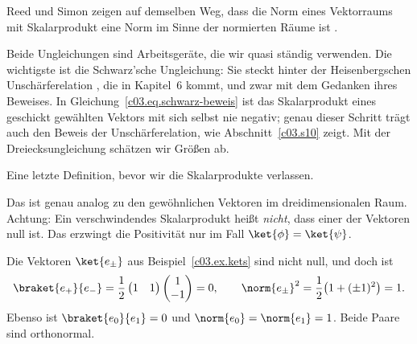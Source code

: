 Reed und Simon zeigen auf demselben Weg, dass die Norm eines Vektorraums mit Skalarprodukt
eine Norm im Sinne der normierten Räume ist .

Beide Ungleichungen sind Arbeitsgeräte, die wir quasi ständig verwenden. Die wichtigste ist
die Schwarz'sche Ungleichung: Sie steckt hinter der Heisenbergschen Unschärferelation
, die in Kapitel~6 kommt, und zwar
mit dem Gedanken ihres Beweises. In Gleichung~\eqref{c03.eq.schwarz-beweis} ist das
Skalarprodukt eines geschickt gewählten Vektors mit sich selbst nie negativ; genau dieser
Schritt trägt auch den Beweis der Unschärferelation, wie Abschnitt~\ref{c03.s10} zeigt. Mit der
Dreiecksungleichung schätzen wir Größen ab.

Eine letzte Definition, bevor wir die Skalarprodukte verlassen.


Das ist genau analog zu den gewöhnlichen Vektoren im dreidimensionalen Raum. Achtung: Ein
verschwindendes Skalarprodukt heißt \emph{nicht}, dass einer der Vektoren null ist. Das
erzwingt die Positivität nur im Fall $\ket{\phi} = \ket{\psi}$.

\begin{example}\label{c03.ex.orthogonal}
  Die Vektoren $\ket{e_\pm}$ aus Beispiel~\ref{c03.ex.kets} sind nicht null, und doch ist
  \begin{equation}\label{c03.eq.orthogonal}
    \braket{e_+}{e_-} = \frac{1}{2} \begin{pmatrix} 1 & 1 \end{pmatrix} \begin{pmatrix} 1 \\ -1 \end{pmatrix} = 0 ,
    \qquad
    \norm{e_\pm}^2 = \frac{1}{2} \bigl( 1 + (\pm 1)^2 \bigr) = 1 .
  \end{equation}
  Ebenso ist $\braket{e_0}{e_1} = 0$ und $\norm{e_0} = \norm{e_1} = 1$. Beide Paare sind
  orthonormal.
\end{example}

